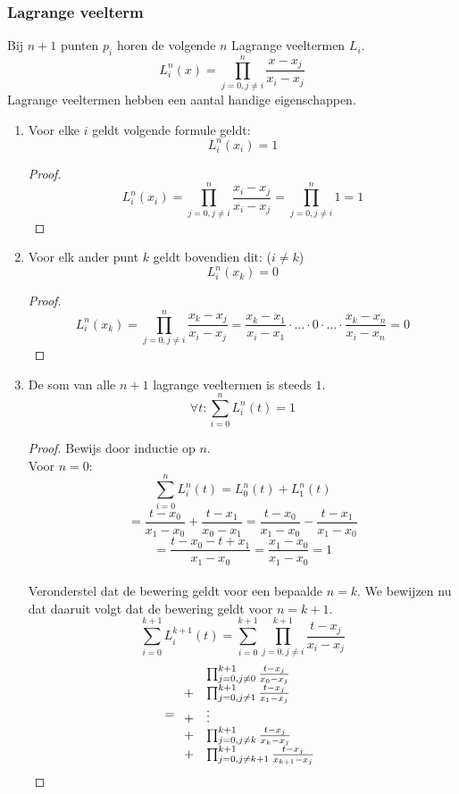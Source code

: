 \documentclass[tmi_notities.tex]{subfiles}
\begin{document}
\subsubsection{Lagrange veelterm}
Bij $n+1$ punten $p_i$ horen de volgende $n$ Lagrange veeltermen $L_i$.
\[
L_{i}^{n}(x) = \prod_{j=0, j \neq i}^{n} \frac{x-x_{j}}{x_{i}-x_{j}}
\]
Lagrange veeltermen hebben een aantal handige eigenschappen.
\begin{enumerate}
\item Voor elke $i$ geldt volgende formule geldt:
\[
L_{i}^{n}(x_i) = 1
\]
\begin{proof}
\[
L_{i}^{n}(x_i)
= \prod_{j=0, j \neq i}^{n} \frac{x_i-x_{j}}{x_{i}-x_{j}}
= \prod_{j=0, j \neq i}^{n} 1
= 1
\]
\end{proof}
\item Voor elk ander punt $k$ geldt bovendien dit: ($i\neq k$)
\[
L_i^{n}(x_k) = 0
\]
\begin{proof}
\[
L_{i}^{n}(x_k)
= \prod_{j=0, j \neq i}^{n} \frac{x_k-x_{j}}{x_{i}-x_{j}}
= \frac{x_k-x_{1}}{x_{i}-x_{1}}\cdot \ldots \cdot 0 \cdot \ldots \cdot \frac{x_k-x_{n}}{x_{i}-x_{n}}
= 0
\]
\end{proof}
\item De som van alle $n+1$ lagrange veeltermen is steeds $1$.
\[
\forall t: \sum_{i=0}^{n}L_i^{n}(t) = 1
\]
\begin{proof}
Bewijs door inductie op $n$.\\
Voor $n=0$:
\[
\sum_{i=0}^{n}L_i^{n}(t) = L_0^{n}(t) +L_1^{n}(t) 
\]
\[
= \frac{t-x_{0}}{x_{1}-x_{0}} + \frac{t-x_{1}}{x_{0}-x_{1}}
= \frac{t-x_{0}}{x_{1}-x_{0}} - \frac{t-x_{1}}{x_{1}-x_{0}}
\]
\[
= \frac{t-x_{0} - t+x_{1}}{x_{1}-x_{0}} = \frac{x_{1}-x_{0}}{x_{1}-x_{0}} = 1
\]\\
Veronderstel dat de bewering geldt voor een bepaalde $n=k$. We bewijzen nu dat daaruit volgt dat de bewering geldt voor $n=k+1$.\\
\[
\sum_{i=0}^{k+1}L_i^{k+1}(t)
= \sum_{i=0}^{k+1} \prod_{j=0, j \neq i}^{k+1} \frac{t-x_{j}}{x_{i}-x_{j}}
\]
\[
=
\begin{array}{l l}
& \prod_{j=0, j \neq 0}^{k+1} \frac{t-x_{j}}{x_{0}-x_{j}}\\
+ & \prod_{j=0, j \neq 1}^{k+1} \frac{t-x_{j}}{x_{1}-x_{j}}\\
+ & \vdots\\
+ & \prod_{j=0, j \neq k}^{k+1} \frac{t-x_{j}}{x_{k}-x_{j}}\\
+ & \prod_{j=0, j \neq k+1}^{k+1} \frac{t-x_{j}}{x_{k+1}-x_{j}}
\end{array}
\]
\end{proof}
\end{enumerate}
\end{document}
